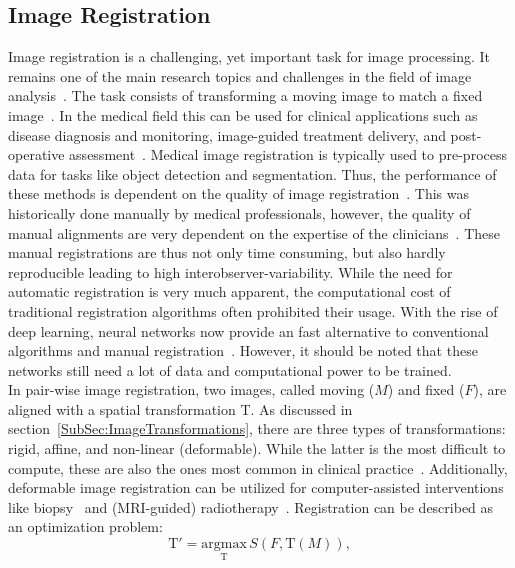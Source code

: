 \subsection{Image Registration} \label{SubSec:ImageRegistration}
Image registration is a challenging, yet important task for image processing. It remains one of the main research topics and challenges in the field of image analysis~\cite{Chen2023}. The task consists of transforming a moving image to match a fixed image~\cite{NiftiReg}. In the medical field this can be used for clinical applications such as disease diagnosis and monitoring, image-guided treatment delivery, and post-operative assessment~\cite{Chen2023}. Medical image registration is typically used to pre-process data for tasks like object detection and segmentation. Thus, the performance of these methods is dependent on the quality of image registration~\cite{Chen2020}. This was historically done manually by medical professionals, however, the quality of manual alignments are very dependent on the expertise of the clinicians~\cite{Haskins2020}. These manual registrations are thus not only time consuming, but also hardly reproducible leading to high interobserver-variability. While the need for automatic registration is very much apparent, the computational cost of traditional registration algorithms often prohibited their usage. With the rise of deep learning, neural networks now provide an fast alternative to conventional algorithms and manual registration~\cite{Haskins2020}. However, it should be noted that these networks still need a lot of data and computational power to be trained.\\
In pair-wise image registration, two images, called moving ($M$) and fixed ($F$), are aligned with a spatial transformation T. As discussed in section~\ref{SubSec:ImageTransformations}, there are three types of transformations: rigid, affine, and non-linear (deformable). While the latter is the most difficult to compute, these are also the ones most common in clinical practice~\cite{Zou2022}. Additionally, deformable image registration can be utilized for computer-assisted interventions like biopsy~\cite{Tam2016} and (MRI-guided) radiotherapy~\cite{Chen2017, Rigaud2019}. Registration can be described as an optimization problem:
\begin{equation}
	\text{T}' = \underset{\text{T}}{\text{argmax}} \, S(F, \text{T}(M)),
\end{equation}

